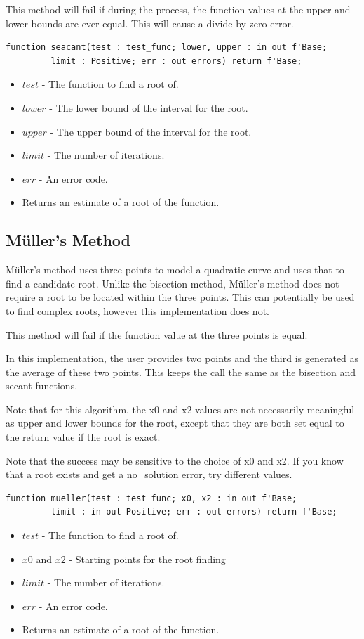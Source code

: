 \documentclass[10pt, openany]{book}
\newcommand{\indexfunc}[1]{\index[func]{#1}}
\begin{document}
This method will fail if during the process, the function values at the upper and lower bounds are ever equal.  This will cause a divide by zero error.
\begin{lstlisting}
function seacant(test : test_func; lower, upper : in out f'Base;
         limit : Positive; err : out errors) return f'Base;
\end{lstlisting}
\indexfunc{root-real-seacant}
\begin{itemize}
  \item $test$ - The function to find a root of.
  \item $lower$ - The lower bound of the interval for the root.
  \item $upper$ - The upper bound of the interval for the root.
  \item $limit$ - The number of iterations.
  \item $err$ - An error code.
  \item Returns an estimate of a root of the function.
\end{itemize}

\subsection{M\"uller's Method}
M\"uller's method uses three points to model a quadratic curve and uses that to find a candidate root.    Unlike the bisection method, M\"uller's method does not require a root to be located within the three points.  This can potentially be used to find complex roots, however this implementation does not.

This method will fail if the function value at the three points is equal.

In this implementation, the user provides two points and the third is generated as the average of these two points.  This keeps the call the same as the bisection and secant functions.

Note that for this algorithm, the x0 and x2 values are not necessarily meaningful as upper and lower bounds for the root, except that they are both set equal to the return value if the root is exact.

Note that the success may be sensitive to the choice of x0 and x2.  If you know that a root exists and get a no\_solution error, try different values.
\begin{lstlisting}
function mueller(test : test_func; x0, x2 : in out f'Base;
         limit : in out Positive; err : out errors) return f'Base;
\end{lstlisting}
\indexfunc{root-real-mueller}
\begin{itemize}
  \item $test$ - The function to find a root of.
  \item $x0$ and $x2$ - Starting points for the root finding
  \item $limit$ - The number of iterations.
  \item $err$ - An error code.
  \item Returns an estimate of a root of the function.
\end{itemize}
\end{document}

